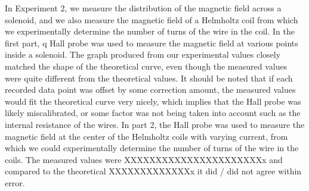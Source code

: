 \documentclass[letterpaper]{article}
\begin{document}
In Experiment 2, we measure the distribution of the magnetic field across a solenoid,
and we also measure the magnetic field of a Helmholtz coil from which we experimentally determine the
number of turns of the wire in the coil. In the first part, q Hall probe was used to measure the magnetic field
at various points inside a solenoid. The graph produced from our experimental values
closely matched the shape of the theoretical curve, even though the measured values were
quite different from the theoretical values. It should be noted that if each recorded
data point was offset by some correction amount, the measured values would fit the
theoretical curve very nicely, which implies that the Hall probe
was likely miscalibrated, or some factor was not being taken into account such as the internal resistance
of the wires. In part 2, the Hall probe was used to measure the magnetic field
at the center of the Helmholtz coils with varying current, from which we could experimentally
determine the number of turns of the wire in the coils. The measured values were XXXXXXXXXXXXXXXXXXXXXXx
and compared to the theoretical XXXXXXXXXXXXXx it did / did not agree within error.


\end{document}

